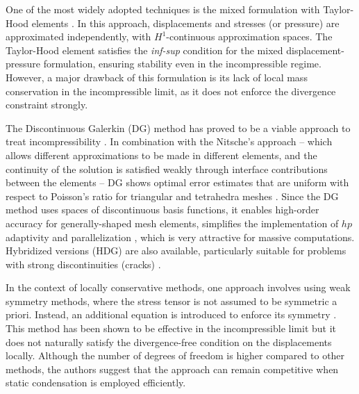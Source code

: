 \documentclass[english,11pt,3p,number,sort&compress]{elsarticle}
\newcommand{\nathan}{\color{red}{\bf\Large NS} \color{cyan} }
\begin{document}

One of the most widely adopted techniques is the mixed formulation \cite{brezzi2012mixed,arnold1988new} with Taylor-Hood elements \cite{taylor1973numerical}. In this approach, displacements and stresses (or pressure) are approximated independently, with $H^1$-continuous approximation spaces. The Taylor-Hood element \cite{taylor1973numerical} satisfies the \textit{inf-sup} condition for the mixed displacement-pressure formulation, ensuring stability even in the incompressible regime. However, a major drawback of this formulation is its lack of local mass conservation in the incompressible limit, as it does not enforce the divergence constraint strongly.

The Discontinuous Galerkin (DG) method has proved to be a viable approach to treat incompressibility \cite{CARVALHO2020, DEVLOO2013}. In combination with the Nitsche's approach -- which allows different approximations to be made in different elements, and the continuity of the solution is satisfied weakly through interface contributions between the elements -- DG shows optimal error estimates that are uniform with respect to Poisson's ratio for triangular and tetrahedra meshes \cite{hansbo2002discontinuous}. Since the DG method uses spaces of discontinuous basis functions, it enables high-order accuracy for generally-shaped mesh elements, simplifies the implementation of $hp$ adaptivity and parallelization \cite{gulizzi2023discontinuous, riviere2003discontinuous}, which is very attractive for massive computations. Hybridized versions (HDG) are also available, particularly suitable for problems with strong discontinuities (cracks) \cite{soon2009hybridizable}. 

In the context of locally conservative methods, one approach involves using weak symmetry methods, where the stress tensor is not assumed to be symmetric a priori. Instead, an additional equation is introduced to enforce its symmetry \cite{DEVLOO2020, DEVLOO2024, Weslley}. This method has been shown to be effective in the incompressible limit but it does not naturally satisfy the divergence-free condition on the displacements locally. Although the number of degrees of freedom is higher compared to other methods, the authors suggest that the approach can remain competitive when static condensation is employed efficiently.
\end{document}
